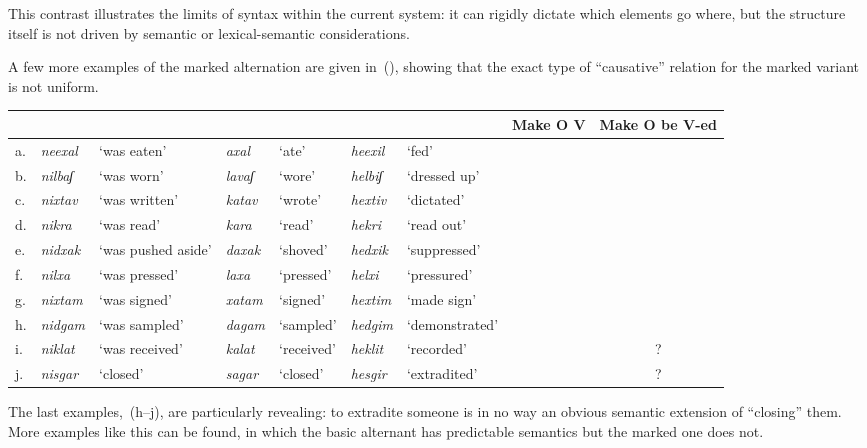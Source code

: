 This contrast illustrates the limits of syntax within the current system: it can rigidly dictate which elements go where, but the structure itself is not driven by semantic or lexical-semantic considerations.

A few more examples of the marked alternation are given in~(\nextx), showing that the exact type of ``causative'' relation for the marked variant is not uniform.
\ex\label{vd:ex:triplets-caus}
\xe
\begin{small}
\hspace{-4em}\begin{tabular}{l|ll|ll|llcc}
		\multicolumn{7}{c}{}		& Make O V	& Make O be V-ed\\\hline
		 a.& \emph{neexal}	& `was eaten'	& \emph{axal} & `ate'		& \emph{heexil} & `fed'			& \cmark	& \xmark\\
		 b.& \emph{nilbaʃ}	& `was worn'	& \emph{lavaʃ} & `wore' 	& \emph{helbiʃ}	&	`dressed up' 	& \cmark	& \xmark\\
		 c.& \emph{nixtav} & `was written' & \emph{katav} & `wrote' & \emph{hextiv} & `dictated' & \cmark	& \xmark\\\hdashline
		d.& \emph{nikra}	& `was read'	& \emph{kara} & `read'		& \emph{hekri}	& `read out'	& \xmark	& \cmark \\
		e.&	\emph{nidxak}	& `was pushed aside'	& \emph{daxak}	& `shoved'	& \emph{hedxik}	& `suppressed'\footnotemark	& \xmark	& \cmark\\
		f.& \emph{nilxa\texttslig}	& `was pressed' &  \emph{laxa\texttslig} & `pressed'	& \emph{helxi\texttslig} & `pressured'	& \xmark	& \cmark \\\hdashline
		 g.& \emph{nixtam}	& `was signed'	& \emph{xatam} & `signed'	& \emph{hextim}	& `made sign'	& \cmark	& \cmark\\\hdashline
		h. & \emph{nidgam} & `was sampled'	& \emph{dagam} & `sampled'	& \emph{hedgim}		& `demonstrated'	& \xmark	& \xmark\\
		i. & \emph{niklat} & `was received' & \emph{kalat} & `received' & \emph{heklit} & `recorded' & \xmark & \cmark?\\
		j.& \emph{nisgar}	& `closed'	& \emph{sagar} & `closed'		& \emph{hesgir} & `extradited'	& \xmark	& \cmark?\\
		\end{tabular}
\end{small}

The last examples,~(\lastx h--j), are particularly revealing: to extradite someone is in no way an obvious semantic extension of ``closing'' them. More examples like this can be found, in which the basic alternant has predictable semantics but the marked one does not.

